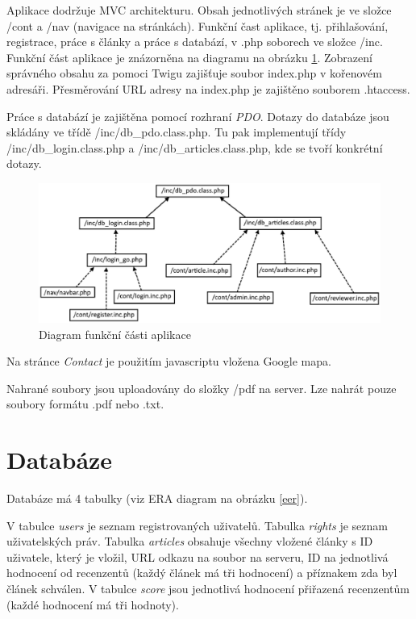 Aplikace dodržuje MVC architekturu. Obsah jednotlivých stránek je ve složce /cont a /nav (navigace na stránkách). Funkční čast aplikace, tj. přihlašování, registrace, práce s články a práce s databází, v .php soborech ve složce /inc. Funkční část aplikace je znázorněna na diagramu na obrázku \ref{uml}. Zobrazení správného obsahu za pomoci Twigu zajišťuje soubor index.php v kořenovém adresáři. Přesměrování URL adresy na index.php je zajištěno souborem .htaccess.

Práce s databází je zajištěna pomocí rozhraní \emph{PDO}. Dotazy do databáze jsou skládány ve třídě /inc/db\_pdo.class.php. Tu pak implementují třídy /inc/db\_login.class.php a /inc/db\_articles.class.php, kde se tvoří konkrétní dotazy.

\begin{figure}[H]
	\centering
	\includegraphics[width=1\textwidth]{img/UML.eps}
	\caption{Diagram funkční části aplikace}
  \label{uml}
\end{figure}


Na stránce \emph{Contact} je použitím javascriptu vložena Google mapa.

Nahrané soubory jsou uploadovány do složky /pdf na server. Lze nahrát pouze soubory formátu .pdf nebo .txt.


\section{Databáze}

Databáze má 4 tabulky (viz ERA diagram na obrázku \ref{eer}).

V tabulce \emph{users} je seznam registrovaných uživatelů. Tabulka \emph{rights} je seznam uživatelských práv. Tabulka \emph{articles} obsahuje všechny vložené články s ID uživatele, který je vložil, URL odkazu na soubor na serveru, ID na jednotlivá hodnocení od recenzentů (každý článek má tři hodnocení) a příznakem zda byl článek schválen. V tabulce \emph{score} jsou jednotlivá hodnocení přiřazená recenzentům (každé hodnocení má tři hodnoty).

